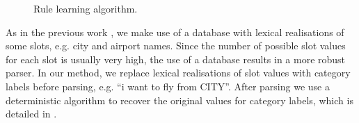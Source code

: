 \documentclass{article}
\begin{document}

\begin{figure}
\vspace{-0.25cm}
\caption{Rule learning algorithm.}
\label{alg:tbl:learning}
\end{figure} 

As in the previous work \cite{mairesse09,he05,zettlemoyer07,meza08b}, we make use of a database with lexical realisations of some slots, e.g. city and airport names. Since the number of possible slot values for each slot is usually very high, the use of a database results in a more robust parser. In our method, we replace lexical realisations of slot values with category labels before parsing, e.g. ``i want to fly from CITY''. 
After parsing we use a deterministic algorithm to recover the original values for category labels, which is detailed in \cite{mairesse09}.

\end{document}
